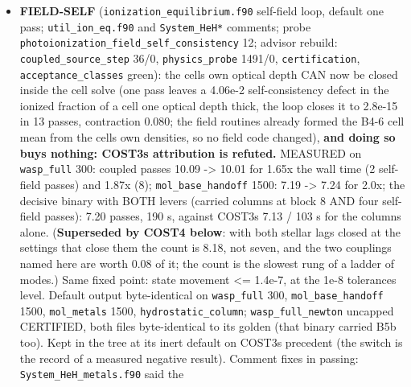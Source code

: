 \documentclass[english,a4paper]{my_memo}
\begin{document}
\begin{itemize}
  \texttt{make\ test}\textquotesingle s \texttt{diffusion\_tests} row is red until it lands. Also recorded:
  the relaxation\textquotesingle s convergence measure is helium-only (DIFT-LINK folds the
  trace drift in); the vanished-element write-back branch leaves a trace row
  at 1e-4 to 2e-2 where an element is driven to exactly zero (deliberate
  guard, measured, documented at the test site); \texttt{element\_transport\_residual}\textquotesingle s
  dummy \texttt{v} is unread.
\item
  \textbf{FIELD-SELF} (\texttt{ionization\_equilibrium.f90} self-field loop, default one
  pass; \texttt{util\_ion\_eq.f90} and \texttt{System\_HeH*} comments; probe
  \texttt{photoionization\_field\_self\_consistency} 12; advisor rebuild:
  \texttt{coupled\_source\_step} 36/0, \texttt{physics\_probe} 1491/0, \texttt{certification},
  \texttt{acceptance\_classes} green): the cell\textquotesingle s own optical depth CAN now be
  closed inside the cell solve (one pass leaves a 4.06e-2 self-consistency
  defect in the ionized fraction of a cell one optical depth thick, the
  loop closes it to 2.8e-15 in 13 passes, contraction 0.080; the field
  routines already formed the B4-6 cell mean from the cell\textquotesingle s own densities,
  so no field code changed), \textbf{and doing so buys nothing: COST3\textquotesingle s
  attribution is refuted.} MEASURED on \texttt{wasp\_full} 300: coupled passes
  10.09 -\textgreater{} 10.01 for 1.65x the wall time (2 self-field passes) and 1.87x (8);
  \texttt{mol\_base\_handoff} 1500: 7.19 -\textgreater{} 7.24 for 2.0x; the decisive binary with
  BOTH levers (carried columns at block 8 AND four self-field passes): 7.20
  passes, 190 s, against COST3\textquotesingle s 7.13 / 103 s for the columns alone.
  (\textbf{Superseded by COST4 below}: with both stellar lags closed at the
  settings that close them the count is 8.18, not seven, and the two
  couplings named here are worth 0.08 of it; the count is the slowest rung
  of a ladder of modes.) Same fixed point: state movement \textless= 1.4e-7, at the 1e-8
  tolerance\textquotesingle s level. Default output byte-identical on \texttt{wasp\_full} 300,
  \texttt{mol\_base\_handoff} 1500, \texttt{mol\_metals} 1500, \texttt{hydrostatic\_column};
  \texttt{wasp\_full\_newton} uncapped CERTIFIED, both files byte-identical to its
  golden (that binary carried B5b too). Kept in the tree at its inert
  default on COST3\textquotesingle s precedent (the switch is the record of a measured
  negative result). Comment fixes in passing: \texttt{System\_HeH\_metals.f90} said the

\end{itemize}
\end{document}
